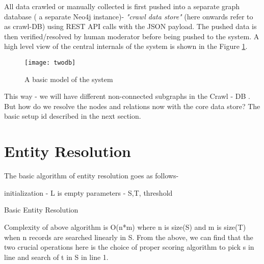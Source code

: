 All data crawled or manually collected is first pushed into a separate graph database ( a separate Neo4j instance)-  \emph{ "crawl data store" } (here onwards refer to as crawl-DB) using REST API calls with the JSON payload. The pushed data is then verified/resolved by human moderator before being pushed to the system. A high level view of the central internals of the system is shown in the Figure \ref{fig:twodb}.

\begin{figure}[H]
\begin{center}  
\texttt{[image: twodb]} 
\caption{A basic model of the system}
\label{fig:twodb}
\end{center}
\end{figure}

This way - we will have different non-connected subgraphs in the Crawl - DB .  
But how do we resolve the nodes and relations now with the core data store? The basic setup id described in the next section. 

\section{Entity Resolution}
\label{dataer}

The basic algorithm of entity resolution goes as follows-

\begin{algorithm}[H]
initialization - L is empty \;
parameters - S,T, threshold \;
 \caption{Basic Entity Resolution}
\end{algorithm}

Complexity of above algorithm is O(n*m) where n is size(S) and m is size(T) when n records are searched linearly in S.
        From the above, we can find that the two crucial operations here is the choice of proper scoring algorithm to pick s in line and search of t in S in line 1.

